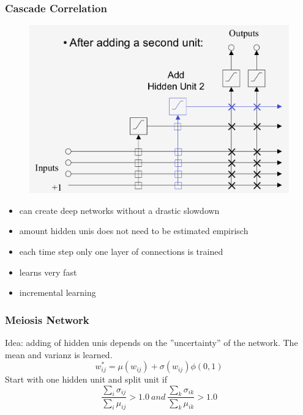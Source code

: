 \subsubsection{Cascade Correlation}
\label{sssect:cascade-correlation}
\begin{figure}[h]
\includegraphics[scale=0.4]{cascade-correlation}
\end{figure}
\begin{itemize}
	\item can create deep networks without a drastic slowdown
	\item amount hidden unis does not need to be estimated empirisch 
	\item each time step only one layer of connections is trained
	\item learns very fast
	\item incremental learning
\end{itemize}

\subsubsection{Meiosis Network}
\label{sssect:meiosis-network}
Idea: adding of hidden unis depends on the ''uncertainty'' of the network. The mean and varianz is learned.
\[
w_{ij}^{*} = \mu(w_{ij}) + \sigma(w_{ij}) \phi(0, 1)
\]
Start with one hidden unit and split unit if
\[
\frac{\sum_i \sigma_{ij}}{\sum_i \mu_{ij}} > 1.0 \: and \: \frac{\sum_k \sigma_{ik}}{\sum_k \mu_{ik}} > 1.0
\]